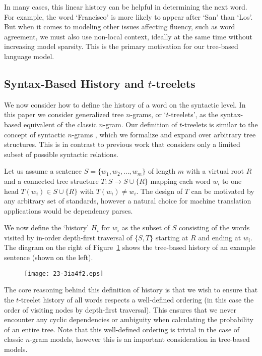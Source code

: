 \documentclass[english]{jnlp_1.4}
\begin{document}
In many cases, this linear history can be helpful in determining the next word.
For example, the word `Francisco' is more likely to appear after `San' than `Los'.
But when it comes to modeling other issues affecting fluency, such as word agreement,
we must also use non-local context, ideally at the same time without
increasing model sparsity. This is the primary motivation for our tree-based
language model.


\subsection{Syntax-Based History and $t$-treelets}

We now consider how to define the history of a word on the syntactic level.
In this paper we consider generalized tree $n$-grams, or `$t$-treelets', as the syntax-based equivalent of the
classic $n$-gram. Our definition of $t$-treelets is similar to the concept of syntactic $n$-grams \cite{Sidorov12},
which we formalize and expand over arbitrary tree structures. This is in contrast to
previous work that considers only a limited subset of possible syntactic relations.

Let us assume a sentence $S = \{w_1, w_2, ..., w_m\}$ of length $m$ with a virtual
root $R$ and a connected tree structure $T:S \rightarrow S \cup \{R\}$ mapping each word $w_i$ to one head
$T(w_i) \in S \cup \{R\}$ with $T(w_i) \ne w_i$. The design of $T$ can be motivated
by any arbitrary set of standards, however a natural choice for machine translation applications
would be dependency parses.

We now define the `history' $H_i$ for $w_i$ as the subset of $S$
consisting of the words visited by in-order depth-first traversal of $\{S,T\}$ starting at $R$ and ending at $w_i$.
The diagram on the right of Figure~\ref{Figure:Model}
shows the tree-based history of an example sentence (shown on the left).

\begin{figure}[t]
\begin{center}
\texttt{[image: 23-3ia4f2.eps]}
\end{center}
\label{Figure:Model}
\end{figure}

The core reasoning behind this definition of history is that we wish to ensure
that the $t$-treelet history of all words respects a well-defined ordering (in this case
the order of visiting nodes by depth-first traversal). This ensures that we never
encounter any cyclic dependencies or ambiguity when calculating the probability of an entire
tree. Note that this well-defined ordering is trivial in the case of classic
$n$-gram models, however this is an important consideration in tree-based models.
\end{document}
